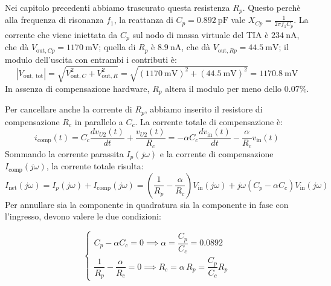 \documentclass[11pt,a4paper]{article}
\begin{document}
Nei capitolo precedenti abbiamo trascurato questa resistenza $R_p$. Questo perchè alla frequenza di risonanza $f_1$, la reattanza di $C_p = \SI{0.892}{\pico\farad}$ vale $X_{Cp} = \frac{1}{2\pi f_1 C_p}$. La corrente che viene iniettata da $C_p$ sul nodo di massa virtuale del TIA è $\SI{234}{\nano\ampere}$, che dà $V_{\text{out}, Cp} = \SI{1170}{\milli\volt}$; quella di $R_p$ è $\SI{8.9}{\nano\ampere}$, che dà $V_{\text{out}, Rp} = \SI{44.5}{\milli\volt}$; il modulo dell'uscita con entrambi i contributi è:
    \begin{equation}
        |V_{\text{out, tot}}| = \sqrt{V_{\text{out}, C}^2 + V_{\text{out}, R}^2} = \sqrt{(\SI{1170}{\milli\volt})^2 + (\SI{44.5}{\milli\volt})^2} = \SI{1170.8}{\milli\volt}
    \end{equation}
    In assenza di compensazione hardware, $R_p$ altera il modulo per meno dello $0.07\%$.


\vspace{0.3cm}
\noindent Per cancellare anche la corrente di $R_p$, abbiamo inserito il resistore di compensazione $R_c$ in parallelo a $C_c$. La corrente totale di compensazione è:
\begin{equation}
    \label{eq:icomp_completa}
    i_{\text{comp}}(t) = C_c \frac{dv_{U2}(t)}{dt} + \frac{v_{U2}(t)}{R_c} = -\alpha C_c \frac{dv_{\text{in}}(t)}{dt} - \frac{\alpha}{R_c} v_{\text{in}}(t)
\end{equation} 
Sommando la corrente parassita $I_p(j\omega)$ e la corrente di compensazione $I_{\text{comp}}(j\omega)$, la corrente totale risulta:
\begin{equation}
    I_{\text{net}}(j\omega) = I_p(j\omega) + I_{\text{comp}}(j\omega) = \left( \frac{1}{R_p} - \frac{\alpha}{R_c} \right) V_{\text{in}}(j\omega) + j\omega \left( C_p - \alpha C_c \right) V_{\text{in}}(j\omega)
\end{equation}
Per annullare sia la componente in quadratura sia la componente in fase con l'ingresso, devono valere le due condizioni:

\begin{equation}
    \label{eq:formula_progetto_rp}
    \begin{cases}
        C_p - \alpha C_c = 0 \implies \alpha = \dfrac{C_p}{C_c} = 0.0892 \\[10pt]
        \dfrac{1}{R_p} - \dfrac{\alpha}{R_c} = 0 \implies R_c = \alpha \, R_p = \dfrac{C_p}{C_c} R_p
    \end{cases}
\end{equation}
\vspace{0.2cm}
\end{document}
